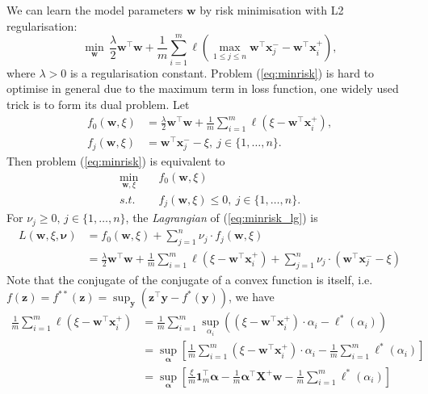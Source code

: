 \documentclass[9pt]{extarticle}
\newcommand{\x}{\mathbf{x}}
\newcommand{\y}{\mathbf{y}}
\newcommand{\z}{\mathbf{z}}
\newcommand{\1}{\mathbf{1}}
\newcommand{\w}{\mathbf{w}}
\newcommand{\X}{\mathbf{X}}
\newcommand{\alphabm}{\bm{\alpha}}
\newcommand{\nubm}{\bm{\nu}}
\newcommand{\ie}{i.e.\ }
\begin{document}
We can learn the model parameters $\w$ by risk minimisation with L2 regularisation:
\begin{equation}
\label{eq:minrisk}
\min_{\w} \, \frac{\lambda}{2} \w^\top \w + \frac{1}{m} \sum_{i=1}^m \ell\left( \max_{1 \le j \le n} \w^\top \x_j^- - \w^\top \x_i^+ \right),
\end{equation}
where $\lambda > 0$ is a regularisation constant.
Problem (\ref{eq:minrisk}) is hard to optimise in general due to the maximum term in loss function, one widely used trick is to form its dual problem.
Let 
\begin{equation*}
\begin{aligned}
f_0 (\w, \xi) &= \frac{\lambda}{2} \w^\top \w + \frac{1}{m} \sum_{i=1}^m \ell\left( \xi - \w^\top \x_i^+ \right), \\
f_j (\w, \xi) &= \w^\top \x_j^- - \xi, \ j \in \{1,\dots,n\}.
\end{aligned}
\end{equation*}
Then problem (\ref{eq:minrisk}) is equivalent to
\begin{equation}
\label{eq:minrisk_lg}
\begin{aligned}
\min_{\w, \xi} \quad & f_0 (\w, \xi) \\
s.t. \quad & f_j (\w, \xi) \le 0, \ j \in \{1,\dots,n\}.
\end{aligned}
\end{equation}
For $\nu_j \ge 0, \, j \in \{1,\dots,n\}$, the \emph{Lagrangian} of (\ref{eq:minrisk_lg}) is
\begin{equation}
\label{eq:minrisk_lg1}
\begin{aligned}
L(\w, \xi, \nubm) 
&= f_0 (\w, \xi) + \sum_{j=1}^n \nu_j \cdot f_j(\w, \xi) \\
&= \frac{\lambda}{2} \w^\top \w + \frac{1}{m} \sum_{i=1}^m \ell\left( \xi - \w^\top \x_i^+ \right) + \sum_{j=1}^n \nu_j \cdot \left( \w^\top \x_j^- - \xi \right)
\end{aligned}
\end{equation}
Note that the conjugate of the conjugate of a convex function is itself, \ie $f(\z) = f^{**}(\z) = \sup_{\y} \left( \z^\top \y - f^*(\y) \right)$, we have
\begin{equation}
\label{eq:lg_part1}
\begin{aligned}
\frac{1}{m} \sum_{i=1}^m \ell\left( \xi - \w^\top \x_i^+ \right)
&= \frac{1}{m} \sum_{i=1}^m \sup_{\alpha_i} \left( (\xi - \w^\top \x_i^+) \cdot \alpha_i - \ell^*(\alpha_i) \right) \\
&= \sup_{\alphabm} \left[ \frac{1}{m} \sum_{i=1}^m (\xi - \w^\top \x_i^+) \cdot \alpha_i - \frac{1}{m} \sum_{i=1}^m \ell^*(\alpha_i) \right] \\
&= \sup_{\alphabm} \left[ \frac{\xi}{m} \1_m^\top \alphabm - \frac{1}{m} \alphabm^\top \X^+ \w - \frac{1}{m} \sum_{i=1}^m \ell^*(\alpha_i) \right] \\
\end{aligned}
\end{equation}
\end{document}
